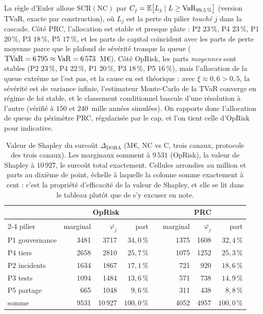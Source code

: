 La règle d'Euler \citep{tasche1999} alloue $\mathrm{SCR}(\text{NC})$ par
$C_j = \mathbb{E}\bigl[L_j \mid L \ge \mathrm{VaR}_{99{,}5\,\%}\bigr]$ (version TVaR, exacte
par construction), où $L_j$ est la perte du pilier \emph{touché} $j$ dans la cascade. Côté
PRC, l'allocation est stable et presque plate : P2 $23\,\%$, P4 $23\,\%$, P1 $20\,\%$,
P3 $18\,\%$, P5 $17\,\%$, et les parts de capital coïncident avec les parts de perte moyenne
parce que le plafond de sévérité tronque la queue
($\mathrm{TVaR} = 6\,795 \approx \mathrm{VaR} = 6\,573$~M\euro). Côté OpRisk, les parts
\emph{moyennes} sont stables (P2 $23\,\%$, P4 $22\,\%$, P1 $20\,\%$, P3 $18\,\%$,
P5 $16\,\%$), mais l'allocation de la queue extrême ne l'est pas, et la cause en est
théorique : avec $\xi \approx 0{,}6 > 0{,}5$, la sévérité est de variance infinie,
l'estimateur Monte-Carlo de la TVaR converge en régime de loi stable, et le classement
conditionnel bascule d'une résolution à l'autre (vérifié à $150$ et $240$~mille années
simulées). On rapporte donc l'allocation de queue du périmètre PRC, régularisée par le cap,
et l'on tient celle d'OpRisk pour indicative.

\begin{table}[H]\centering\small
\renewcommand{\arraystretch}{1.25}
\begin{tabular}{@{}l rrr c rrr@{}}
\toprule
& \multicolumn{3}{c}{OpRisk} & & \multicolumn{3}{c}{PRC} \\
\cmidrule{2-4}\cmidrule{6-8}
pilier & marginal & $\varphi_j$ & part & & marginal & $\varphi_j$ & part \\
\midrule
P1 gouvernance & 3481 & 3717 & $34{,}0\,\%$ & & 1375 & 1608 & $32{,}4\,\%$ \\
P4 tiers       & 2658 & 2810 & $25{,}7\,\%$ & & 1075 & 1252 & $25{,}3\,\%$ \\
P2 incidents   & 1634 & 1867 & $17{,}1\,\%$ & &  721 &  920 & $18{,}6\,\%$ \\
P3 tests       & 1094 & 1484 & $13{,}6\,\%$ & &  571 &  738 & $14{,}9\,\%$ \\
P5 partage     &  665 & 1048 &  $9{,}6\,\%$ & &  311 &  438 &  $8{,}8\,\%$ \\
\midrule
somme          & 9531 & 10\,927 & $100{,}0\,\%$ & & 4052 & 4957 & $100{,}0\,\%$ \\
\bottomrule
\end{tabular}
\caption{Valeur de Shapley du surcoût $\Delta_{\text{DORA}}$ (M\euro, NC vs C, trois canaux,
protocole des trois canaux). Les marginaux somment à $9\,531$ (OpRisk), la valeur de
Shapley à $10\,927$, le surcoût total exactement. Cellules arrondies au million et parts au
dixième de point, échelle à laquelle la colonne somme exactement à cent : c'est la propriété
d'efficacité de la valeur de Shapley, et elle se lit dans le tableau plutôt que de s'y
excuser en note.}
\label{tab:shapley}
\end{table}

